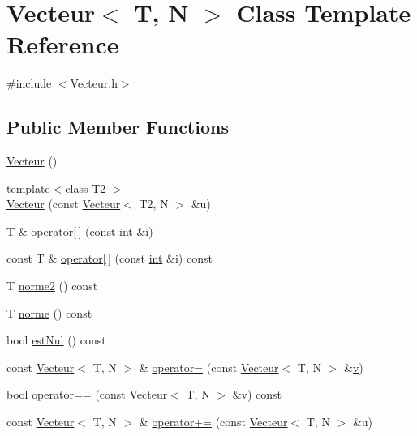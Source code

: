 \hypertarget{class_vecteur}{\section{Vecteur$<$ T, N $>$ Class Template Reference}
\label{class_vecteur}
}


{\ttfamily \#include $<$Vecteur.\-h$>$}

\subsection*{Public Member Functions}
\begin{DoxyCompactItemize}
\item 
\hyperlink{class_vecteur_a1138645efb6ed44618997e251c2b4009}{Vecteur} ()
\item 
{\footnotesize template$<$class T2 $>$ }\\\hyperlink{class_vecteur_aade7047bc2f5a25defc4a4e9a1d1be72}{Vecteur} (const \hyperlink{class_vecteur}{Vecteur}$<$ T2, N $>$ \&u)
\item 
T \& \hyperlink{class_vecteur_a738e84b97dd0eb0d18f1c22cca6308c0}{operator\mbox{[}$\,$\mbox{]}} (const \hyperlink{wglew_8h_a500a82aecba06f4550f6849b8099ca21}{int} \&i)
\item 
const T \& \hyperlink{class_vecteur_acfa03e9e3f3f4e0550f355570c193658}{operator\mbox{[}$\,$\mbox{]}} (const \hyperlink{wglew_8h_a500a82aecba06f4550f6849b8099ca21}{int} \&i) const 
\item 
T \hyperlink{class_vecteur_acc12011c6c561eb98505dd947915d5d3}{norme2} () const 
\item 
T \hyperlink{class_vecteur_ac839506f4c3fad8696eef68399e08ddd}{norme} () const 
\item 
bool \hyperlink{class_vecteur_a96cbeae90d0d5a5771a85823cf3ea069}{est\-Nul} () const 
\item 
const \hyperlink{class_vecteur}{Vecteur}$<$ T, N $>$ \& \hyperlink{class_vecteur_a61868c0f4a49218690f7e95f0c4953aa}{operator=} (const \hyperlink{class_vecteur}{Vecteur}$<$ T, N $>$ \&\hyperlink{glew_8h_a6509431814422c215a65946289dd98b8}{v})
\item 
bool \hyperlink{class_vecteur_a40916960c6af2ba46039d6638de1ee83}{operator==} (const \hyperlink{class_vecteur}{Vecteur}$<$ T, N $>$ \&\hyperlink{glew_8h_a6509431814422c215a65946289dd98b8}{v}) const 
\item 
const \hyperlink{class_vecteur}{Vecteur}$<$ T, N $>$ \& \hyperlink{class_vecteur_a4f59d8249b46ee3ab38dc820bc498d4f}{operator+=} (const \hyperlink{class_vecteur}{Vecteur}$<$ T, N $>$ \&u)

\end{DoxyCompactItemize}

